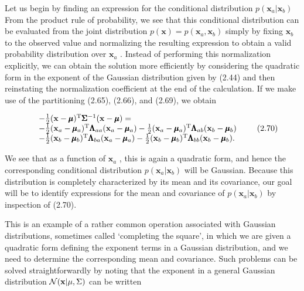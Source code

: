 \documentclass[
  10
]{article}
\begin{document}
Let us begin by finding an expression for the conditional distribution
\(p ( \mathbf { x } _ { a } | \mathbf { x } _ { b } )\) From the product
rule of probability, we see that this conditional distribution can be
evaluated from the joint distribution
\(p ( \mathbf { x } ) = p ( \mathbf { x } _ { a } , \mathbf { x } _ { b } )\)
simply by fixing \(\mathbf { x } _ { b }\) to the observed value and
normalizing the resulting expression to obtain a valid probability
distribution over \(\mathbf { x } _ { a }\) . Instead of performing this
normalization explicitly, we can obtain the solution more efficiently by
considering the quadratic form in the exponent of the Gaussian
distribution given by (2.44) and then reinstating the normalization
coefficient at the end of the calculation. If we make use of the
partitioning (2.65), (2.66), and (2.69), we obtain

\[
\begin{array}{r l} & {- \frac {1}{2} (\mathbf {x} - \pmb {\mu}) ^ {\mathrm{T}} \pmb {\Sigma} ^ {- 1} (\mathbf {x} - \pmb {\mu}) =} \\ & {- \frac {1}{2} (\mathbf {x} _ {a} - \pmb {\mu} _ {a}) ^ {\mathrm{T}} \pmb {\Lambda} _ {a a} (\mathbf {x} _ {a} - \pmb {\mu} _ {a}) - \frac {1}{2} (\mathbf {x} _ {a} - \pmb {\mu} _ {a}) ^ {\mathrm{T}} \pmb {\Lambda} _ {a b} (\mathbf {x} _ {b} - \pmb {\mu} _ {b})} \\ & {- \frac {1}{2} (\mathbf {x} _ {b} - \pmb {\mu} _ {b}) ^ {\mathrm{T}} \pmb {\Lambda} _ {b a} (\mathbf {x} _ {a} - \pmb {\mu} _ {a}) - \frac {1}{2} (\mathbf {x} _ {b} - \pmb {\mu} _ {b}) ^ {\mathrm{T}} \pmb {\Lambda} _ {b b} (\mathbf {x} _ {b} - \pmb {\mu} _ {b}).} \end{array}\tag{2.70}
\]

We see that as a function of \(\mathbf { x } _ { a }\) , this is again a
quadratic form, and hence the corresponding conditional distribution
\(p ( \mathbf { x } _ { a } | \mathbf { x } _ { b } )\) will be
Gaussian. Because this distribution is completely characterized by its
mean and its covariance, our goal will be to identify expressions for
the mean and covariance of
\(p ( \mathbf { x } _ { a } | \mathbf { x } _ { b } )\) by inspection of
(2.70).

This is an example of a rather common operation associated with Gaussian
distributions, sometimes called `completing the square', in which we are
given a quadratic form defining the exponent terms in a Gaussian
distribution, and we need to determine the corresponding mean and
covariance. Such problems can be solved straightforwardly by noting that
the exponent in a general Gaussian distribution
\(\mathcal { N } ( { \bf x } | \mu , \Sigma )\) can be written
\end{document}
